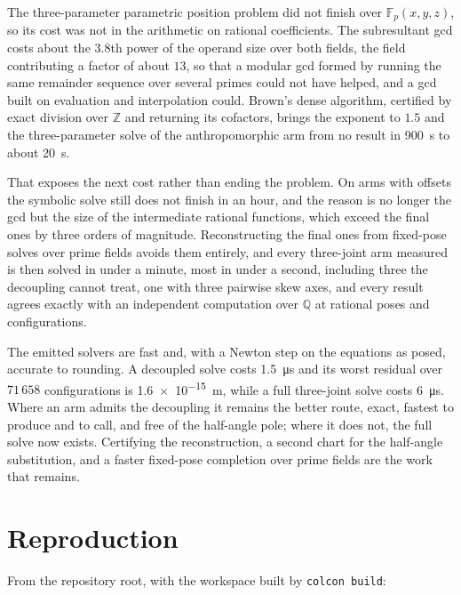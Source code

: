 \documentclass[11pt,a4paper]{article}
\theoremstyle{plain}
\theoremstyle{definition}
\theoremstyle{remark}
\newcommand{\FF}{\mathbb{F}}
\newcommand{\QQ}{\mathbb{Q}}
\begin{document}
The three-parameter parametric position problem did not finish over $\FF_p(x,y,z)$, so its cost was
not in the arithmetic on rational coefficients. The subresultant gcd costs about the $3.8$th power of
the operand size over both fields, the field contributing a factor of about $13$, so that a modular
gcd formed by running the same remainder sequence over several primes could not have helped, and a
gcd built on evaluation and interpolation could. Brown's dense algorithm, certified by exact division
over $\mathbb{Z}$ and returning its cofactors, brings the exponent to $1.5$ and the three-parameter
solve of the anthropomorphic arm from no result in \SI{900}{\second} to about \SI{20}{\second}.

That exposes the next cost rather than ending the problem. On arms with offsets the symbolic solve
still does not finish in an hour, and the reason is no longer the gcd but the size of the
intermediate rational functions, which exceed the final ones by three orders of magnitude.
Reconstructing the final ones from fixed-pose solves over prime fields avoids them entirely, and
every three-joint arm measured is then solved in under a minute, most in under a second, including three the
decoupling cannot treat, one with three pairwise skew axes, and every result agrees exactly
with an independent computation over $\QQ$ at rational poses and configurations.

The emitted solvers are fast and, with a Newton step on the equations as posed, accurate to
rounding. A decoupled solve costs \SI{1.5}{\micro\second} and its worst residual over $71\,658$
configurations is \SI{1.6e-15}{\metre}, while a full three-joint solve costs \SI{6}{\micro\second}.
Where an arm admits the decoupling it remains the better route, exact, fastest to produce and to call,
and free of the half-angle pole; where it does not, the full solve now exists. Certifying the
reconstruction, a second chart for the half-angle substitution, and a faster fixed-pose completion
over prime fields are the work that remains.

\appendix

\section{Reproduction}
\label{app:repro}

From the repository root, with the workspace built by \texttt{colcon build}:
\end{document}

